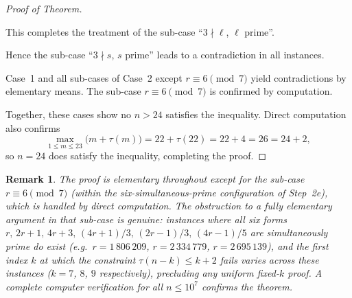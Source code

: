 \documentclass[11pt]{article}
\newtheorem{remark}{Remark}
\begin{document}
\begin{proof}[Proof of Theorem]
\begin{itemize}
\begin{itemize}
    This completes the treatment of the sub-case
    ``$3 \nmid \ell$, $\ell$ prime''.

  \end{itemize}
  Hence the sub-case ``$3 \nmid s$, $s$ prime'' leads to a contradiction in
  all instances.
\end{itemize}

Case~1 and all sub-cases of Case~2 except $r \equiv 6 \pmod 7$ yield
contradictions by elementary means.  The sub-case $r \equiv 6 \pmod 7$ is
confirmed by computation.

\medskip
Together, these cases show no $n > 24$ satisfies the inequality.
Direct computation also confirms
\[
  \max_{1 \le m \le 23}\bigl(m + \tau(m)\bigr) = 22 + \tau(22) = 22 + 4 = 26 = 24 + 2,
\]
so $n = 24$ does satisfy the inequality, completing the proof.
\end{proof}

\begin{remark}
The proof is elementary throughout except for the sub-case
$r \equiv 6 \pmod 7$ (within the six-simultaneous-prime configuration
of Step~2e), which is handled by direct computation.  The obstruction
to a fully elementary argument in that sub-case is genuine: instances
where all six forms $r,\, 2r+1,\, 4r+3,\, (4r+1)/3,\, (2r-1)/3,\,
(4r-1)/5$ are simultaneously prime do exist (e.g.\ $r = 1\,806\,209$,
$r = 2\,334\,779$, $r = 2\,695\,139$), and the first index $k$ at which
the constraint $\tau(n-k) \le k+2$ fails varies across these instances
($k = 7$, $8$, $9$ respectively), precluding any uniform fixed-$k$ proof.
A complete computer verification for all $n \le 10^7$ confirms the theorem.
\end{remark}
\end{document}
